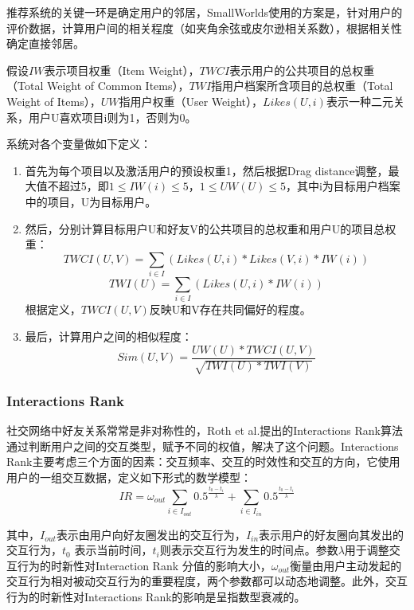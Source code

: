 推荐系统的关键一环是确定用户的邻居，SmallWorlds使用的方案是，针对用户的评价数据，计算用户间的相关程度（如夹角余弦或皮尔逊相关系数），根据相关性确定直接邻居。

假设$IW$表示项目权重（Item Weight），$TWCI$表示用户的公共项目的总权重（Total Weight of Common Items），$TWI$指用户档案所含项目的总权重（Total Weight of Items），$UW$指用户权重（User Weight），$Likes(U,i)$表示一种二元关系，用户U喜欢项目i则为1，否则为0。

系统对各个变量做如下定义：
\begin{enumerate}[（1）]
\item 首先为每个项目以及激活用户的预设权重1，然后根据Drag distance调整，最大值不超过5，即$1 \le IW(i) \le 5$，$1 \le UW(U) \le 5$，其中i为目标用户档案中的项目，U为目标用户。

\item 然后，分别计算目标用户U和好友V的公共项目的总权重和用户U的项目总权重：
\[TWCI(U,V)=\sum_{i \in I}{(Likes(U,i)*Likes(V,i)*IW(i))}\]
\[TWI(U)=\sum_{i \in I}{(Likes(U,i)*IW(i))}\]
根据定义，$TWCI(U,V)$反映U和V存在共同偏好的程度。

\item 最后，计算用户之间的相似程度：
\[Sim(U,V)=\frac{UW(U)*TWCI(U,V)}{\sqrt{TWI(U)*TWI(V)}}\]

\end{enumerate}

\subsubsection{Interactions Rank}
社交网络中好友关系常常是非对称性的，Roth et al.提出的Interactions Rank算法\cite{roth2010suggesting} 通过判断用户之间的交互类型，赋予不同的权值，解决了这个问题。Interactions Rank主要考虑三个方面的因素：交互频率、交互的时效性和交互的方向，它使用用户的一组交互数据，定义如下形式的数学模型：
\begin{equation}\label{eq:interactrank}
IR=\omega_{out} \sum_{i \in I_{out}}{0.5^{\frac{t_0-t_i}{\lambda}}+\sum_{i \in I_{in}}{0.5^{\frac{t_0-t_i}{\lambda}}}}
\end{equation}

其中，$I_{out}$表示由用户向好友圈发出的交互行为，$I_{in}$表示用户的好友圈向其发出的交互行为，$t_0$ 表示当前时间，$t_i$则表示交互行为发生的时间点。参数$\lambda$用于调整交互行为的时新性对Interaction Rank 分值的影响大小，$\omega_{out}$衡量由用户主动发起的交互行为相对被动交互行为的重要程度，两个参数都可以动态地调整。此外，交互行为的时新性对Interactions Rank的影响是呈指数型衰减的。

